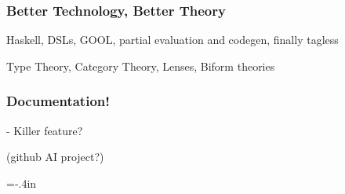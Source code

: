 \documentclass[usenames,dvipsnames]{beamer}
\begin{document}
  
\begin{frame}
  
  \frametitle{Better Technology, Better Theory}
Haskell, DSLs, GOOL, partial evaluation and codegen, finally tagless

Type Theory, Category Theory, Lenses, Biform theories

\end{frame}
  
\begin{frame}
  
  \frametitle{Documentation!}
- Killer feature?

(github AI project?)
\end{frame}
  
\hoffset=-.4in %
\begin{frame}[plain] %

  
\end{frame}
\hoffset=0in %
\end{document}
